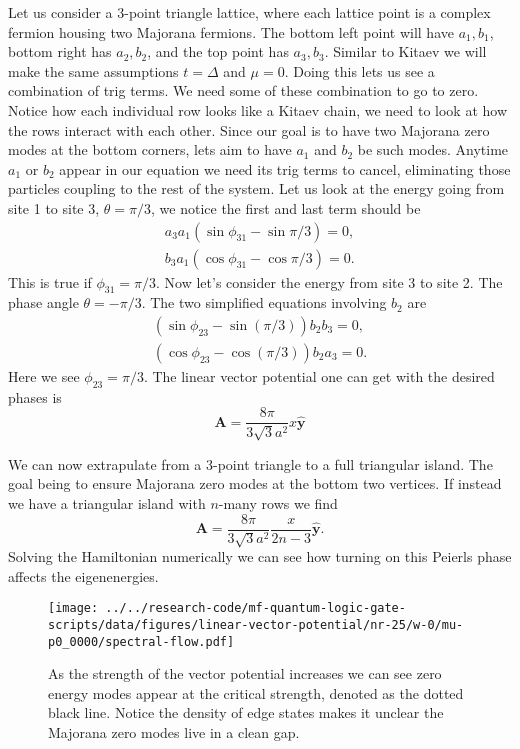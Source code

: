 \documentclass[aps,prb,showpacs,twocolumn,amsmath,amssymb,superscriptaddress]{revtex4-2}
\let\oldhat\hat
\renewcommand{\hat}[1]{\oldhat{\mathbf{#1}}}
\renewcommand{\vec}[1]{\mathbf{#1}}
\newcommand{\de}{\Delta}
\begin{document}
Let us consider a 3-point triangle lattice, where each lattice point is a complex fermion housing two Majorana fermions.
The bottom left point will have $a_1, b_1$, bottom right has $a_2, b_2$, and the top point has $a_3, b_3$.
Similar to Kitaev we will make the same assumptions $t=\de$ and $\mu=0$.
Doing this lets us see a combination of trig terms.
We need some of these combination to go to zero.
Notice how each individual row looks like a Kitaev chain, we need to look at how the rows interact with each other.
Since our goal is to have two Majorana zero modes at the bottom corners, lets aim to have $a_1$ and $b_2$ be such modes.
Anytime $a_1$ or $b_2$ appear in our equation we need its trig terms to cancel, eliminating those particles coupling to the rest of the system.
Let us look at the energy going from site 1 to site 3, $\theta = \pi/3$, we notice the first and last term should be
\begin{align}
  a_3 a_1 (\sin\phi_{31} - \sin\pi/3) = 0, \\
  b_3 a_1 (\cos\phi_{31} - \cos\pi/3) = 0.
\end{align}
This is true if $\phi_{31} = \pi/3$.
Now let's consider the energy from site 3 to site 2.
The phase angle $\theta = -\pi/3$.
The two simplified equations involving $b_2$ are
\begin{align}
  (\sin\phi_{23} - \sin(\pi/3)) b_2 b_3 = 0, \nonumber \\
  (\cos\phi_{23} - \cos(\pi/3)) b_2 a_3 = 0. \nonumber
\end{align}
Here we see $\phi_{23} = \pi/3$.
The linear vector potential one can get with the desired phases is
\begin{equation}
  \vec{A} = \dfrac{8 \pi}{3 \sqrt{3} a^2} x \hat{y}
\end{equation}

We can now extrapulate from a 3-point triangle to a full triangular island.
The goal being to ensure Majorana zero modes at the bottom two vertices.
If instead we have a triangular island with $n$-many rows we find
\begin{equation}
  \vec{A} = \dfrac{8 \pi}{3 \sqrt{3} a^2} \dfrac{x}{2n-3} \hat{y}.
\end{equation}
Solving the Hamiltonian numerically we can see how turning on this Peierls phase affects the eigenenergies.
\begin{figure}[h]
\texttt{[image: ../../research-code/mf-quantum-logic-gate-scripts/data/figures/linear-vector-potential/nr-25/w-0/mu-p0\_0000/spectral-flow.pdf]}
\caption{As the strength of the vector potential increases we can see zero energy modes appear at the critical strength, denoted as the dotted black line. Notice the density of edge states makes it unclear the Majorana zero modes live in a clean gap.}
\end{figure}
\end{document}
